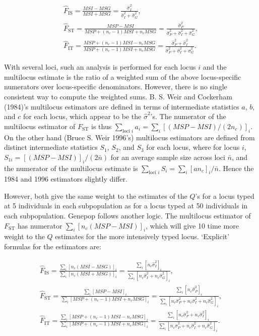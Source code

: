 \documentclass[
  12pt,
]{book}
\begin{document}
\[\begin{gathered}
    \hat{F}_{\mathrm{IS}}=    \frac{MSI-MSG}{MSI+MSG}=
    \frac{\hat{\sigma}^2_I}{\hat{\sigma}^2_I+\hat{\sigma}^2_G}, \\
        \hat{F}_{\mathrm{ST}}=    \frac{MSP-MSI}{MSP+(n_c-1)MSI+n_cMSG}=
    \frac{\hat{\sigma}^2_P}{\hat{\sigma}^2_P+\hat{\sigma}^2_I+\hat{\sigma}^2_G}, \\
        \hat{F}_{\mathrm{IT}}=    \frac{MSP+(n_c-1)MSI-n_cMSG}{MSP+(n_c-1)MSI+n_cMSG}=
    \frac{\hat{\sigma}^2_P+\hat{\sigma}^2_I}{\hat{\sigma}^2_P+\hat{\sigma}^2_I+\hat{\sigma}^2_G}.\end{gathered}\]

With several loci, such an analysis is performed for each locus \(i\) and the multilocus estimate is the ratio of a weighted sum of the above locus-specific numerators over locus-specific denominators. However, there is no single consistent way to compute the weighted sums. B. S. Weir and Cockerham (1984)'s multilocus estimators are defined in terms of intermediate statistics \(a\), \(b\), and \(c\) for each locus, which appear to be the \(\hat{\sigma}^2\)'s. The numerator of the multilocus estimator of \(F_\mathrm{ST}\) is thus \(\sum_{\textrm{loci }i}a_i=\sum_{i}[(MSP-MSI)/(2n_c)]_i\). On the other hand (Bruce S. Weir 1996's) multilocus estimators are defined from distinct intermediate statistics \(S_1\), \(S_2\), and \(S_3\) for each locus, where for locus \(i\), \(S_{1i}=[(MSP-MSI)]_i/(2\bar{n})\) for an average sample size across loci \(\bar{n}\), and the numerator of the multilocus estimate is \(\sum_{\textrm{loci }i}S_i=\sum_{i}[a n_c]_i/\bar{n}\). Hence the 1984 and 1996 estimators slightly differ.

However, both give the same weight to the estimates of the \(Q\)'s for a locus typed at 5 individuals in each subpopulation as for a locus typed at 50 individuals in each subpopulation. Genepop follows another logic. The multilocus estimator of \(F_\mathrm{ST}\) has numerator \(\sum_i [n_c(MSP-MSI)]_i\), which will give 10 time more weight to the \(Q\) estimates for the more intensively typed locus. `Explicit' formulas for the estimators are:

\[\begin{gathered}
    \hat{F}_{\mathrm{IS}}=    \frac{\sum_i [n_c(MSI-MSG)]_i}{\sum_i [n_c(MSI+MSG)]_i}=
    \frac{\sum_i [n_c\hat{\sigma}^2_I]_i}{\sum_i [n_c\hat{\sigma}^2_I+n_c\hat{\sigma}^2_G]_i}, \\
        \hat{F}_{\mathrm{ST}}=    \frac{\sum_i [MSP-MSI]_i}{\sum_i [MSP+(n_c-1)MSI+n_cMSG]_i}=
    \frac{\sum_i [n_c\hat{\sigma}^2_P]_i}{\sum_i [n_c\hat{\sigma}^2_P+n_c\hat{\sigma}^2_I+n_c\hat{\sigma}^2_G]_i}, \\
        \hat{F}_{\mathrm{IT}}=    \frac{\sum_i [MSP+(n_c-1)MSI-n_cMSG]_i}{\sum_i [MSP+(n_c-1)MSI+n_cMSG]_i}=
    \frac{\sum_i [n_c\hat{\sigma}^2_P+n_c\hat{\sigma}^2_I]_i}{\sum_i [n_c\hat{\sigma}^2_P+n_c\hat{\sigma}^2_I+n_c\hat{\sigma}^2_G]_i}.\end{gathered}\]
\end{document}
